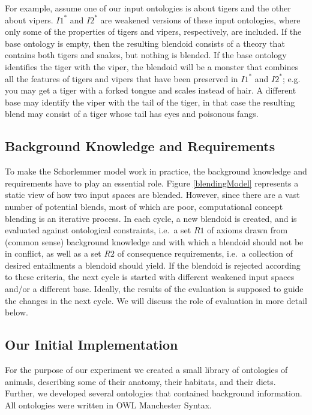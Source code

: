 \documentclass[letterpaper]{article}
\begin{document}
For example, assume one of our input ontologies is about tigers and the other about vipers.
 $I1^*$ and $I2^*$ are weakened versions of these input ontologies, where only some of the 
 properties of tigers and vipers, respectively, are included. If the base ontology is empty, then 
 the resulting blendoid consists of a theory that contains both tigers and snakes, but nothing is blended.
  If the base ontology identifies the tiger with the viper, the blendoid will be a monster that combines all 
  the features of tigers and vipers that have  been preserved in $I1^*$ and $I2^*$; e.g. you may get a tiger 
  with a forked tongue and scales instead of hair. A different base may identify the viper with the tail of the 
  tiger, in that case the resulting blend may consist of a tiger whose tail has eyes and poisonous fangs.

\subsection{Background Knowledge and Requirements}
To make the Schorlemmer model work in practice, the background knowledge 
and requirements have to play an essential role.  Figure \ref{blendingModel} 
represents a static view of how two input spaces are blended. However, since there are a
 vast number of potential blends, most of which are poor, computational concept blending is an iterative process.
  In each cycle, a new blendoid is created, and is evaluated against ontological constraints, i.e.\ a set $R1$ of axioms drawn from (common sense) background knowledge and with which a blendoid should not be in conflict, as well as a set  $R2$ of consequence requirements, i.e.\ a collection of desired entailments a blendoid should yield. If the blendoid is rejected according to these criteria, the next cycle is started with different weakened input spaces and/or a different base.
    Ideally, the results of the evaluation is supposed to guide the changes in the next cycle. %
    We will discuss the role of evaluation in more detail below.



\subsection{Our Initial Implementation}
For the purpose of our experiment we created a small library of ontologies
 of animals, describing some of their anatomy, their habitats, and their diets.
  Further, we developed several ontologies that contained background information. 
  All ontologies were written in OWL Manchester Syntax.
\end{document}
